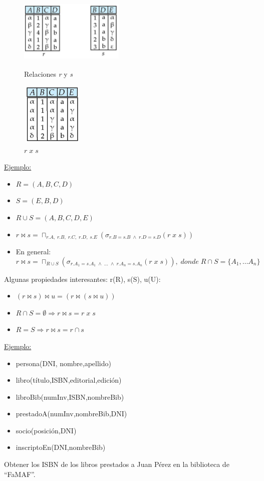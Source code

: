 \documentclass[12pt,a4paper]{report}
\begin{document}
		\begin{figure}[htb]
				\centering
				\includegraphics[width=5cm, height=3cm]{./imagenes/nj1.png}
				\caption{Relaciones \textit{r} y \textit{s}}
				\vspace{5mm}
				\includegraphics[width=3cm, height=3cm]{./imagenes/nj2.png}
				\caption{$r \; x \; s$}
		\end{figure}

		\underline{Ejemplo:}
		\begin{itemize}
			\item $R = (A, B, C, D)$
			\item $S = (E, B, D)$
			\item $R \cup S = (A, B, C, D, E)$
			\item $r \bowtie s = \sqcap_{r.A, \; r.B, \; r.C, \; r.D, \; s.E}(\sigma_{r.B = s.B \; \land \; r.D = s.D} (r \; x \; s))$
			\item En general:
			\[r \bowtie s = \sqcap_{R \cup S}(\sigma_{r.A_{1}=s.A_{1} \; \land \; \dotsc \; \land \; r.A_{n} = s.A_{n}} (r \; x \; s)), \; donde \; R \cap S = \lbrace {A_{1}, \dotsc A_{n}} \rbrace\]
		\end{itemize}
		\par Algunas propiedades interesantes: r(R), s(S), u(U):
		\begin{itemize}
			\item $(r \bowtie s) \bowtie u = (r \bowtie (s \bowtie u))$
			\item $R \cap S = \emptyset \Rightarrow r \bowtie s = r \; x \; s$
			\item $R = S \Rightarrow r \bowtie s = r \cap s$
		\end{itemize}
		
		\underline{Ejemplo:}
		\begin{itemize}
			\item persona(DNI, nombre,apellido)
			\item libro(título,ISBN,editorial,edición)
			\item libroBib(numInv,ISBN,nombreBib)
			\item prestadoA(numInv,nombreBib,DNI)
			\item socio(posición,DNI)
			\item inscriptoEn(DNI,nombreBib)
		\end{itemize}
		\par Obtener los ISBN de los libros prestados a Juan Pérez en la biblioteca de “FaMAF”.
\end{document}
